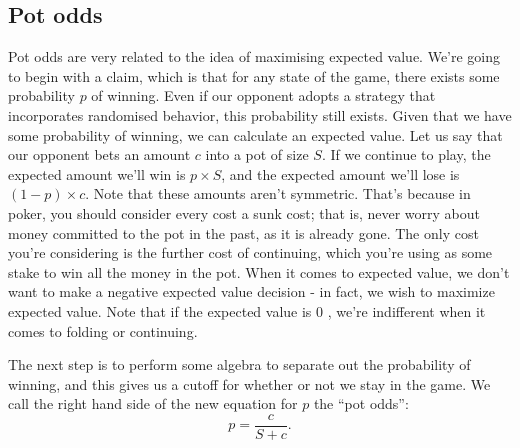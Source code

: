\documentclass{article}
\begin{document}
\subsection{Pot odds}
Pot odds are very related to the idea of maximising expected value. We're going to begin with a claim, which is that for any state of the game, there exists some probability $p$ of winning. Even if our opponent adopts a strategy that incorporates randomised behavior, this probability still exists. Given that we have some probability of winning, we can calculate an expected value. Let us say that our opponent bets an amount $c$ into a pot of size $S$. If we continue to play, the expected amount we'll win is $p \times S$, and the expected amount we'll lose is $(1-p) \times c$. Note that these amounts aren't symmetric. That's because in poker, you should consider every cost a sunk cost; that is, never worry about money committed to the pot in the past, as it is already gone. The only cost you're considering is the further cost of continuing, which you're using as some stake to win all the money in the pot. When it comes to expected value, we don't want to make a negative expected value decision - in fact, we wish to maximize expected value. Note that if the expected value is 0 , we're indifferent when it comes to folding or continuing.

The next step is to perform some algebra to separate out the probability of winning, and this gives us a cutoff for whether or not we stay in the game. We call the right hand side of the new equation for $p$ the ``pot odds'':
\[p=\frac{c}{S+c}.\]
\end{document}
